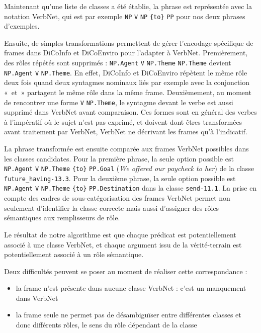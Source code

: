 Maintenant qu'une liste de classes a été établie, la phrase est représentée
avec la notation VerbNet, qui est par exemple \texttt{NP} \texttt{V}
\texttt{NP} \texttt{\{to\}} \texttt{PP} pour nos deux phrases d'exemples.

Ensuite, de simples transformations permettent de gérer l'encodage spécifique
de frames dans DiCoInfo et DiCoEnviro pour l'adapter à VerbNet. Premièrement,
des rôles répétés sont supprimés : \texttt{NP.Agent} \texttt{V}
\texttt{NP.Theme} \texttt{NP.Theme} devient \texttt{NP.Agent} \texttt{V}
\texttt{NP.Theme}. En effet, DiCoInfo et DiCoEnviro répètent le même rôle deux
fois quand deux syntagmes nominaux liés par exemple avec la conjonction «~et~»
partagent le même rôle dans la même frame. Deuxièmement, au moment de
rencontrer une forme \texttt{V} \texttt{NP.Theme}, le syntagme devant le verbe
est aussi supprimé dans VerbNet avant comparaison. Ces formes sont en général
des verbes à l'impératif où le sujet n'est pas exprimé, et doivent dont êtres
transformées avant traitement par VerbNet, VerbNet ne décrivant les frames qu'à
l'indicatif.

La phrase transformée est ensuite comparée aux frames VerbNet possibles dans
les classes candidates. Pour la première phrase, la seule option possible est
\texttt{NP.Agent} \texttt{V} \texttt{NP.Theme} \texttt{\{to\}} \texttt{PP.Goal}
(\textit{We offered our paycheck to her}) de la classe
\texttt{future\_having-13.3}. Pour la deuxième phrase, la seule option possible
est \texttt{NP.Agent} \texttt{V} \texttt{NP.Theme} \texttt{\{to\}}
\texttt{PP.Destination} dans la classe \texttt{send-11.1}. La prise en compte
des cadres de sous-catégorisation des frames VerbNet permet non seulement
d'identifier la classe correcte mais aussi d'assigner des rôles sémantiques aux
remplisseurs de rôle.

Le résultat de notre algorithme est que chaque prédicat est potentiellement
associé à une classe VerbNet, et chaque argument issu de la vérité-terrain est
potentiellement associé à un rôle sémantique.

Deux difficultés peuvent se poser au moment de réaliser cette correspondance :
\begin{itemize}

    \item la frame n'est présente dans aucune classe VerbNet : c'est un
        manquement dans VerbNet

    \item la frame seule ne permet pas de désambiguïser entre différentes
        classes et donc différents rôles, le sens du rôle dépendant de la
        classe

\end{itemize}
        

